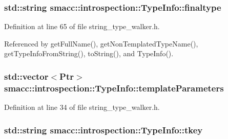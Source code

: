 \subsubsection[{\texorpdfstring{finaltype}{finaltype}}]{\setlength{\rightskip}{0pt plus 5cm}std\+::string smacc\+::introspection\+::\+Type\+Info\+::finaltype\hspace{0.3cm}{\ttfamily [private]}}\hypertarget{classsmacc_1_1introspection_1_1TypeInfo_aa4010ed427e12db443e08ab16a3de243}{}\label{classsmacc_1_1introspection_1_1TypeInfo_aa4010ed427e12db443e08ab16a3de243}


Definition at line 65 of file string\+\_\+type\+\_\+walker.\+h.



Referenced by get\+Full\+Name(), get\+Non\+Templated\+Type\+Name(), get\+Type\+Info\+From\+String(), to\+String(), and Type\+Info().

\subsubsection[{\texorpdfstring{template\+Parameters}{templateParameters}}]{\setlength{\rightskip}{0pt plus 5cm}std\+::vector$<${\bf Ptr}$>$ smacc\+::introspection\+::\+Type\+Info\+::template\+Parameters}\hypertarget{classsmacc_1_1introspection_1_1TypeInfo_aed5166ab8bcd94489e7bc87deb01de5c}{}\label{classsmacc_1_1introspection_1_1TypeInfo_aed5166ab8bcd94489e7bc87deb01de5c}


Definition at line 34 of file string\+\_\+type\+\_\+walker.\+h.

\subsubsection[{\texorpdfstring{tkey}{tkey}}]{\setlength{\rightskip}{0pt plus 5cm}std\+::string smacc\+::introspection\+::\+Type\+Info\+::tkey\hspace{0.3cm}{\ttfamily [private]}}\hypertarget{classsmacc_1_1introspection_1_1TypeInfo_a697dd505119258dba1224d10eea5b2bd}{}\label{classsmacc_1_1introspection_1_1TypeInfo_a697dd505119258dba1224d10eea5b2bd}


